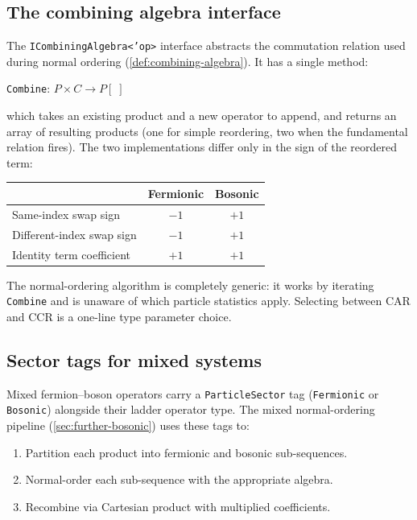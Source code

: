 \subsection*{The combining algebra interface}

The \texttt{ICombiningAlgebra<'op>} interface abstracts the
commutation relation used during normal ordering
(\cref{def:combining-algebra}).  It has a single method:

\begin{center}
\texttt{Combine}: $P \times C \to P[\;]$
\end{center}

\noindent
which takes an existing product and a new operator to append, and
returns an array of resulting products (one for simple reordering,
two when the fundamental relation fires).  The two implementations
differ only in the sign of the reordered term:

\begin{center}
\begin{tabular}{@{}lcc@{}}
\toprule
& \textbf{Fermionic} & \textbf{Bosonic} \\
\midrule
Same-index swap sign & $-1$ & $+1$ \\
Different-index swap sign & $-1$ & $+1$ \\
Identity term coefficient & $+1$ & $+1$ \\
\bottomrule
\end{tabular}
\end{center}

The normal-ordering algorithm is completely generic: it works by
iterating \texttt{Combine} and is unaware of which particle statistics
apply.  Selecting between CAR and CCR is a one-line type parameter
choice.

\subsection*{Sector tags for mixed systems}

Mixed fermion--boson operators carry a \texttt{ParticleSector} tag
(\texttt{Fermionic} or \texttt{Bosonic}) alongside their ladder
operator type.  The mixed normal-ordering pipeline
(\cref{sec:further-bosonic}) uses these tags to:

\begin{enumerate}
  \item Partition each product into fermionic and bosonic
    sub-sequences.
  \item Normal-order each sub-sequence with the appropriate algebra.
  \item Recombine via Cartesian product with multiplied coefficients.
\end{enumerate}

